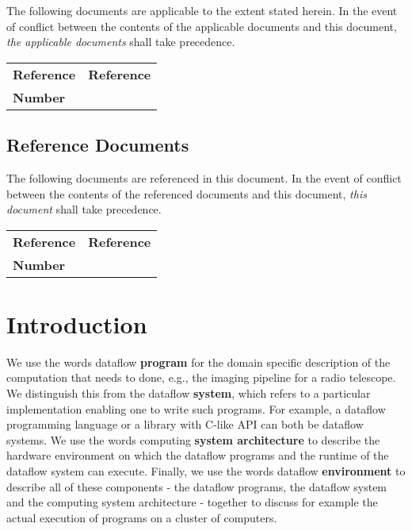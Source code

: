 \documentclass[11pt,a4paper]{article}
\begin{document}
The following documents are applicable to the extent stated herein. In the
event of conflict between the contents of the applicable documents and this
document, \emph{the applicable documents} shall take precedence.

\begin{center}{
\begin{tabularx}{\textwidth}{|X|X|}
    \hline
    \bf{Reference} & \bf{Reference}\\
    \bf{Number} & \\
    \hline
\end{tabularx}}
\end{center}

\subsection*{Reference Documents}

The following documents are referenced in this document. In the event of
conflict between the contents of the referenced documents and this document,
\emph{this document} shall take precedence.

\begin{center}{
\begin{tabularx}{\textwidth}{|X|X|}
    \hline
    \bf{Reference} & \bf{Reference}\\
    \bf{Number} & \\
    \hline
\end{tabularx}}
\end{center}




\newpage
\section{Introduction}

We use the words dataflow {\bf program} for the domain specific
description of the computation that needs to done, e.g., the imaging
pipeline for a radio telescope.  We distinguish this from the dataflow
{\bf system}, which refers to a particular implementation enabling one
to write such programs. For example, a dataflow programming language
or a library with C-like API can both be dataflow systems.  We use the
words computing {\bf system architecture} to describe the hardware
environment on which the dataflow programs and the runtime of the
dataflow system can execute.  Finally, we use the words dataflow {\bf
  environment} to describe all of these components - the dataflow
programs, the dataflow system and the computing system architecture -
together to discuss for example the actual execution of programs on a
cluster of computers.
\end{document}
